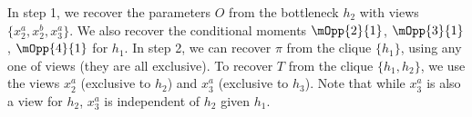 In step 1, we recover the parameters $O$ from the bottleneck $h_2$ with
  views $\{x^a_2, x^b_2, x^a_3\}$. We also recover the conditional moments
  $\mOpp{2}{1}$, $\mOpp{3}{1}$, $\mOpp{4}{1}$ for $h_1$. 
In step 2, we can recover $\pi$ from the clique $\{h_1\}$, using any
  one of views (they are all exclusive). 
To recover $T$ from the clique $\{h_1, h_2\}$, we use the views $x^a_2$
  (exclusive to $h_2$) and $x^a_3$ (exclusive to $h_3$). Note that while
  $x^a_3$ is also a view for $h_2$, $x^a_3$ is independent of $h_2$ given
  $h_1$.

